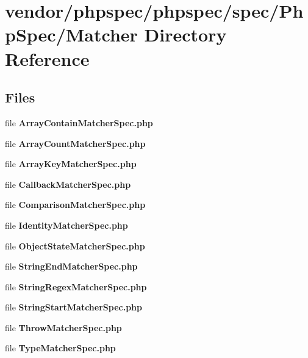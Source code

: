 \section{vendor/phpspec/phpspec/spec/\+Php\+Spec/\+Matcher Directory Reference}
\label{dir_8533221c70b5f65e4623a2cbcf0ff2fd}
\subsection*{Files}
\begin{DoxyCompactItemize}
\item 
file {\bf Array\+Contain\+Matcher\+Spec.\+php}
\item 
file {\bf Array\+Count\+Matcher\+Spec.\+php}
\item 
file {\bf Array\+Key\+Matcher\+Spec.\+php}
\item 
file {\bf Callback\+Matcher\+Spec.\+php}
\item 
file {\bf Comparison\+Matcher\+Spec.\+php}
\item 
file {\bf Identity\+Matcher\+Spec.\+php}
\item 
file {\bf Object\+State\+Matcher\+Spec.\+php}
\item 
file {\bf String\+End\+Matcher\+Spec.\+php}
\item 
file {\bf String\+Regex\+Matcher\+Spec.\+php}
\item 
file {\bf String\+Start\+Matcher\+Spec.\+php}
\item 
file {\bf Throw\+Matcher\+Spec.\+php}
\item 
file {\bf Type\+Matcher\+Spec.\+php}
\end{DoxyCompactItemize}
